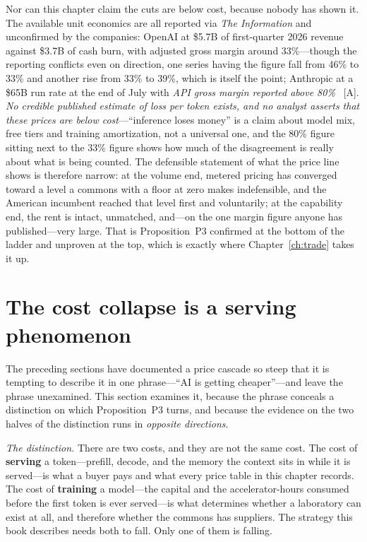 Nor can this chapter claim the cuts are below cost, because nobody has shown it. The available unit economics are all reported via \emph{The Information} and unconfirmed by the companies: OpenAI at \$5.7B of first-quarter 2026 revenue against \$3.7B of cash burn, with adjusted gross margin around 33\%---though the reporting conflicts even on direction, one series having the figure fall from 46\% to 33\% and another rise from 33\% to 39\%, which is itself the point; Anthropic at a \$65B run rate at the end of July with \emph{API gross margin reported above 80\%}~\cite{openai-econ} [A]. \emph{No credible published estimate of loss per token exists, and no analyst asserts that these prices are below cost}---``inference loses money'' is a claim about model mix, free tiers and training amortization, not a universal one, and the 80\% figure sitting next to the 33\% figure shows how much of the disagreement is really about what is being counted. The defensible statement of what the price line shows is therefore narrow: at the volume end, metered pricing has converged toward a level a commons with a floor at zero makes indefensible, and the American incumbent reached that level first and voluntarily; at the capability end, the rent is intact, unmatched, and---on the one margin figure anyone has published---very large. That is Proposition~P3 confirmed at the bottom of the ladder and unproven at the top, which is exactly where Chapter~\ref{ch:trade} takes it up.

\section{The cost collapse is a serving phenomenon}
\label{sec:serving-collapse}

The preceding sections have documented a price cascade so steep that it is tempting to describe it in one phrase---``AI is getting cheaper''---and leave the phrase unexamined. This section examines it, because the phrase conceals a distinction on which Proposition~P3 turns, and because the evidence on the two halves of the distinction runs in \emph{opposite directions}.

\emph{The distinction.} There are two costs, and they are not the same cost. The cost of \textbf{serving} a token---prefill, decode, and the memory the context sits in while it is served---is what a buyer pays and what every price table in this chapter records. The cost of \textbf{training} a model---the capital and the accelerator-hours consumed before the first token is ever served---is what determines whether a laboratory can exist at all, and therefore whether the commons has suppliers. The strategy this book describes needs both to fall. Only one of them is falling.

